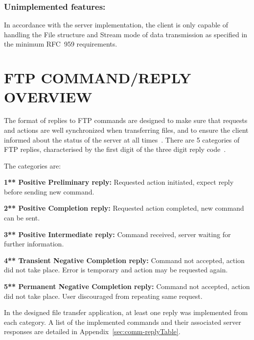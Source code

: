 \documentclass[10pt,twocolumn]{witseiepaper}
\begin{document}




\subsubsection*{Unimplemented features: } 
In accordance with the server implementation, the client is only capable of handling the File structure and Stream mode of data transmission as specified in the minimum RFC~959 requirements.



\section{FTP COMMAND/REPLY OVERVIEW}\label{sec:command/reply}

The format of replies to FTP commands are designed to make sure that requests and actions are well synchronized when transferring files, and to ensure the client informed about the status of the server at all times~\cite{rfc959}. There are 5 categories of FTP replies, characterised by the first digit of the three digit reply code~\cite{rfc959}. 

The categories are: 

\textbf{1**	Positive Preliminary reply:} 
Requested action initiated, expect reply before sending new command.

\textbf{2**	Positive Completion reply:} 
Requested action completed, new command can be sent.

\textbf{3**   Positive Intermediate reply:} 
Command received, server waiting for further information.

\textbf{4**   Transient Negative Completion reply:} 
Command not accepted, action did not take place. Error is temporary and action may be requested again.

\textbf{5**   Permanent Negative Completion reply:} 
Command not accepted, action did not take place. User discouraged from repeating same request.

In the designed file transfer application, at least one reply was implemented from each category. A list of the implemented commands and their associated server responses are detailed in Appendix~\ref{sec:comm-replyTable}.
\end{document}
